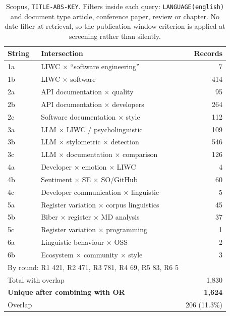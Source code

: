 \documentclass[conference]{IEEEtran}
\begin{document}
\begin{table}[htbp]
\caption{Scopus, \texttt{TITLE-ABS-KEY}. Filters inside each
query: \texttt{LANGUAGE(english)} and document type article, conference paper,
review or chapter. No date filter at retrieval, so the publication-window
criterion is applied at screening rather than silently.}
\label{tbl:search}
\begin{center}
\begin{tabular}{llr}
\toprule
\textbf{String} & \textbf{Intersection} & \textbf{Records} \\
\midrule
1a & LIWC $\times$ ``software engineering''      & 7 \\
1b & LIWC $\times$ software                      & 414 \\
2a & API documentation $\times$ quality          & 95 \\
2b & API documentation $\times$ developers       & 264 \\
2c & Software documentation $\times$ style       & 112 \\
3a & LLM $\times$ LIWC / psycholinguistic        & 109 \\
3b & LLM $\times$ stylometric $\times$ detection & 546 \\
3c & LLM $\times$ documentation $\times$ comparison & 126 \\
4a & Developer $\times$ emotion $\times$ LIWC    & 4 \\
4b & Sentiment $\times$ SE $\times$ SO/GitHub    & 60 \\
4c & Developer communication $\times$ linguistic & 5 \\
5a & Register variation $\times$ corpus linguistics & 45 \\
5b & Biber $\times$ register $\times$ MD analysis & 37 \\
5c & Register variation $\times$ programming     & 1 \\
6a & Linguistic behaviour $\times$ OSS           & 2 \\
6b & Ecosystem $\times$ community $\times$ style & 3 \\
\midrule
\multicolumn{2}{l}{By round: R1 421, R2 471, R3 781, R4 69, R5 83, R6 5} & \\
\multicolumn{2}{l}{Total with overlap} & 1{,}830 \\
\multicolumn{2}{l}{\textbf{Unique after combining with OR}} & \textbf{1{,}624} \\
\multicolumn{2}{l}{Overlap} & 206 (11.3\%) \\
\bottomrule
\end{tabular}
\end{center}
\end{table}
\end{document}

